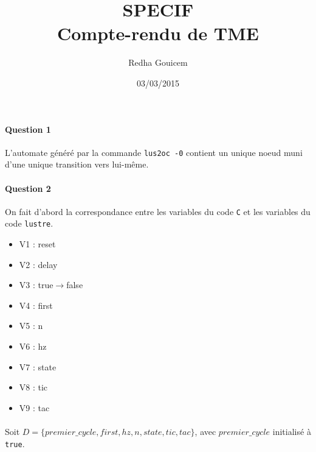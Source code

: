 \documentclass[a4paper, 11pt]{article}
\begin{document}
 
\title{SPECIF\\Compte-rendu de TME}
\author{Redha Gouicem}
\date{03/03/2015}
 
\maketitle
 
\paragraph{Question 1}
L'automate généré par la commande \texttt{lus2oc -0} contient un unique noeud muni d'une unique transition vers 
lui-même. 

\paragraph{Question 2}
On fait d'abord la correspondance entre les variables du code \texttt{C} et les variables du code 
\texttt{lustre}.
\begin{itemize}
  \item V1 : reset
  \item V2 : delay
  \item V3 : true$\rightarrow$false
  \item V4 : first
  \item V5 : n
  \item V6 : hz
  \item V7 : state
  \item V8 : tic
  \item V9 : tac
\end{itemize}

\paragraph{}
Soit $D = \{premier\_cycle, first, hz, n, state, tic, tac\}$, avec $premier\_cycle$ initialisé à \texttt{true}.
\end{document}
